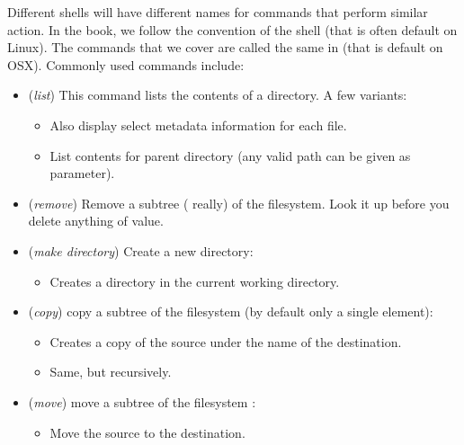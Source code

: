 Different shells will have different names for commands that perform similar action. In the book, we follow the convention of the  shell (that is often default on Linux). The commands that we cover are called the same in  (that is default on OSX). Commonly used commands include:
\begin{itemize}
  \item {} (\textsl{list}) This command lists the contents of a directory. A few variants:
    \begin{itemize}
      \item {} Also display select metadata information for each file.
      \item {} List contents for parent directory (any valid path can be given as parameter).
    \end{itemize}
  \item {} (\textsl{remove}) Remove a subtree ( really) of the filesystem. Look it up before you delete anything of value.
  \item {} (\textsl{make directory}) Create a new directory:
    \begin{itemize}
      \item {} Creates a directory in the current working directory.
    \end{itemize}
  \item {} (\textsl{copy}) copy a subtree of the filesystem (by default only a single element):
    \begin{itemize}
      \item {} Creates a copy of the source under the name of the destination.
      \item {} Same, but recursively.
    \end{itemize}
  \item {} (\textsl{move}) move a subtree of the filesystem :
    \begin{itemize}
      \item {} Move the source to the destination.
    \end{itemize}
\end{itemize}


